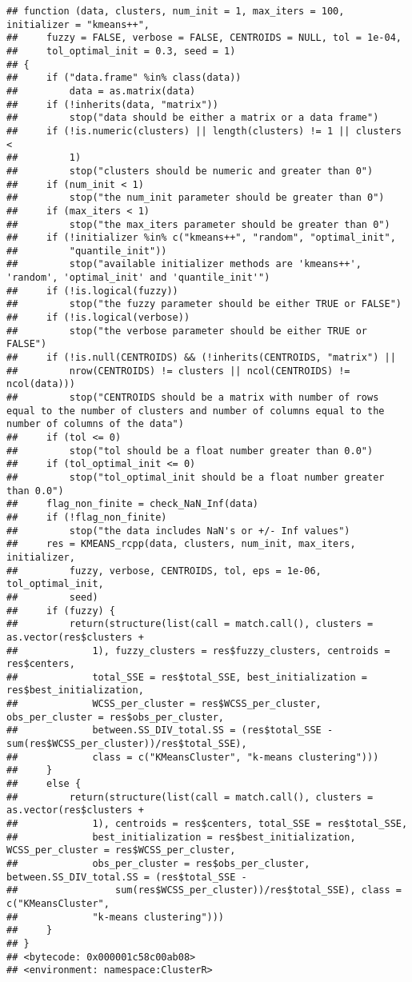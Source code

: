 \documentclass[
]{article}
\begin{document}
\begin{verbatim}
## function (data, clusters, num_init = 1, max_iters = 100, initializer = "kmeans++", 
##     fuzzy = FALSE, verbose = FALSE, CENTROIDS = NULL, tol = 1e-04, 
##     tol_optimal_init = 0.3, seed = 1) 
## {
##     if ("data.frame" %in% class(data)) 
##         data = as.matrix(data)
##     if (!inherits(data, "matrix")) 
##         stop("data should be either a matrix or a data frame")
##     if (!is.numeric(clusters) || length(clusters) != 1 || clusters < 
##         1) 
##         stop("clusters should be numeric and greater than 0")
##     if (num_init < 1) 
##         stop("the num_init parameter should be greater than 0")
##     if (max_iters < 1) 
##         stop("the max_iters parameter should be greater than 0")
##     if (!initializer %in% c("kmeans++", "random", "optimal_init", 
##         "quantile_init")) 
##         stop("available initializer methods are 'kmeans++', 'random', 'optimal_init' and 'quantile_init'")
##     if (!is.logical(fuzzy)) 
##         stop("the fuzzy parameter should be either TRUE or FALSE")
##     if (!is.logical(verbose)) 
##         stop("the verbose parameter should be either TRUE or FALSE")
##     if (!is.null(CENTROIDS) && (!inherits(CENTROIDS, "matrix") || 
##         nrow(CENTROIDS) != clusters || ncol(CENTROIDS) != ncol(data))) 
##         stop("CENTROIDS should be a matrix with number of rows equal to the number of clusters and number of columns equal to the number of columns of the data")
##     if (tol <= 0) 
##         stop("tol should be a float number greater than 0.0")
##     if (tol_optimal_init <= 0) 
##         stop("tol_optimal_init should be a float number greater than 0.0")
##     flag_non_finite = check_NaN_Inf(data)
##     if (!flag_non_finite) 
##         stop("the data includes NaN's or +/- Inf values")
##     res = KMEANS_rcpp(data, clusters, num_init, max_iters, initializer, 
##         fuzzy, verbose, CENTROIDS, tol, eps = 1e-06, tol_optimal_init, 
##         seed)
##     if (fuzzy) {
##         return(structure(list(call = match.call(), clusters = as.vector(res$clusters + 
##             1), fuzzy_clusters = res$fuzzy_clusters, centroids = res$centers, 
##             total_SSE = res$total_SSE, best_initialization = res$best_initialization, 
##             WCSS_per_cluster = res$WCSS_per_cluster, obs_per_cluster = res$obs_per_cluster, 
##             between.SS_DIV_total.SS = (res$total_SSE - sum(res$WCSS_per_cluster))/res$total_SSE), 
##             class = c("KMeansCluster", "k-means clustering")))
##     }
##     else {
##         return(structure(list(call = match.call(), clusters = as.vector(res$clusters + 
##             1), centroids = res$centers, total_SSE = res$total_SSE, 
##             best_initialization = res$best_initialization, WCSS_per_cluster = res$WCSS_per_cluster, 
##             obs_per_cluster = res$obs_per_cluster, between.SS_DIV_total.SS = (res$total_SSE - 
##                 sum(res$WCSS_per_cluster))/res$total_SSE), class = c("KMeansCluster", 
##             "k-means clustering")))
##     }
## }
## <bytecode: 0x000001c58c00ab08>
## <environment: namespace:ClusterR>
\end{verbatim}
\end{document}
